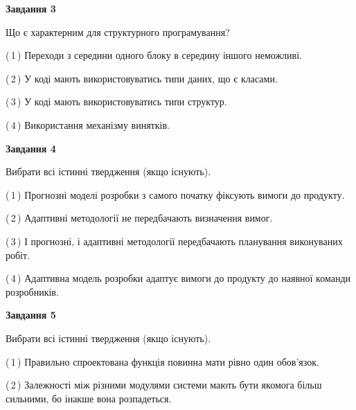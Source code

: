 \documentclass[10pt, ukrainian]{article}
\begin{document}
{\begin {large}
{\begin {center}\textbf{Завдання 3}\end {center}}\par
Що є характерним для структурного програмування?\par
\vspace{2mm}



(\,1\,) Переходи з середини одного блоку в середину іншого неможливі. %



(\,2\,) У коді мають використовуватись типи даних, що є класами. %



(\,3\,) У коді мають використовуватись типи структур. %



(\,4\,) Використання механізму винятків. %


{\begin {center}\textbf{Завдання 4}\end {center}}\par
Вибрати всі істинні твердження (якщо існують).\par
\vspace{2mm}



(\,1\,) Прогнозні моделі розробки з самого початку фіксують вимоги до продукту. %



(\,2\,) Адаптивні методології не передбачають визначення вимог. %



(\,3\,) І прогнозні, і адаптивні методології передбачають планування виконуваних робіт. %



(\,4\,) Адаптивна модель розробки адаптує вимоги до продукту до наявної команди розробників. %


{\begin {center}\textbf{Завдання 5}\end {center}}\par
Вибрати всі істинні твердження (якщо існують).\par
\vspace{2mm}



(\,1\,) Правильно спроектована функція повинна мати рівно один обов'язок. %



(\,2\,) Залежності між різними модулями системи мають бути якомога більш сильними, бо інакше вона розпадеться. %




\end{large}}
\end{document}
